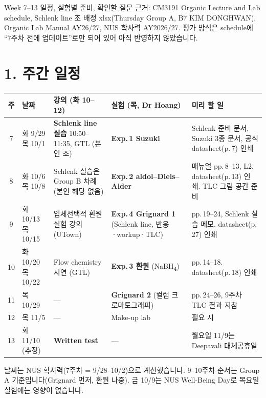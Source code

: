 \documentclass[10pt,a4paper]{article}
\begin{document}
{Week 7--13 일정, 실험별 준비, 확인할 질문}
{근거: CM3191 Organic Lecture and Lab schedule, Schlenk line 조 배정 xlsx(Thursday Group A, B7 KIM DONGHWAN), Organic Lab Manual AY26/27, NUS 학사력 AY2026/27. 평가 방식은 schedule에 ``7주차 전에 업데이트''로만 되어 있어 아직 반영하지 않았습니다.}

\section*{1. 주간 일정}
\renewcommand{\arraystretch}{1.3}
\begin{tabularx}{\linewidth}{|c|>{\footnotesize}p{2.1cm}|>{\footnotesize}X|>{\footnotesize}X|>{\footnotesize}p{3.6cm}|}
\hline
\textbf{주} & \textbf{날짜} & \textbf{강의 (화 10--12)} & \textbf{실험 (목, Dr Hoang)} & \textbf{미리 할 일} \\ \hline
7 & 화 9/29 \newline 목 10/1 &
\textbf{Schlenk line 실습} 10:50--11:35, GTL (본인 조) &
\textbf{Exp.\,1 Suzuki} &
Schlenk 준비 문서, Suzuki 3종 문서, 공식 datasheet(p.\,7) 인쇄 \\ \hline
8 & 화 10/6 \newline 목 10/8 &
Schlenk 실습은 Group B 차례 (본인 해당 없음) &
\textbf{Exp.\,2 aldol--Diels--Alder} &
매뉴얼 pp.\,8--13, L2. datasheet(p.\,13) 인쇄. TLC 그림 공간 준비 \\ \hline
9 & 화 10/13 \newline 목 10/15 &
입체선택적 환원 실험 강의 (UTown) &
\textbf{Exp.\,4 Grignard 1} (Schlenk line, 반응·workup·TLC) &
pp.\,19--24, Schlenk 실습 메모. datasheet(p.\,27) 인쇄 \\ \hline
10 & 화 10/20 \newline 목 10/22 &
Flow chemistry 시연 (GTL) &
\textbf{Exp.\,3 환원} (NaBH\textsubscript{4}) &
pp.\,14--18. datasheet(p.\,18) 인쇄 \\ \hline
11 & 목 10/29 & --- & \textbf{Grignard 2} (컬럼 크로마토그래피) & pp.\,24--26, 9주차 TLC 결과 지참 \\ \hline
12 & 목 11/5 & --- & Make-up lab & 필요 시 \\ \hline
13 & 화 11/10 (추정) & \textbf{Written test} & --- & 월요일 11/9는 Deepavali 대체공휴일 \\ \hline
\end{tabularx}
\renewcommand{\arraystretch}{1}
{\footnotesize 날짜는 NUS 학사력(7주차 = 9/28--10/2)으로 계산했습니다. 9--10주차 순서는 Group A 기준입니다(Grignard 먼저, 환원 나중). 금 10/9는 NUS Well-Being Day로 목요일 실험에는 영향이 없습니다.}
\end{document}
